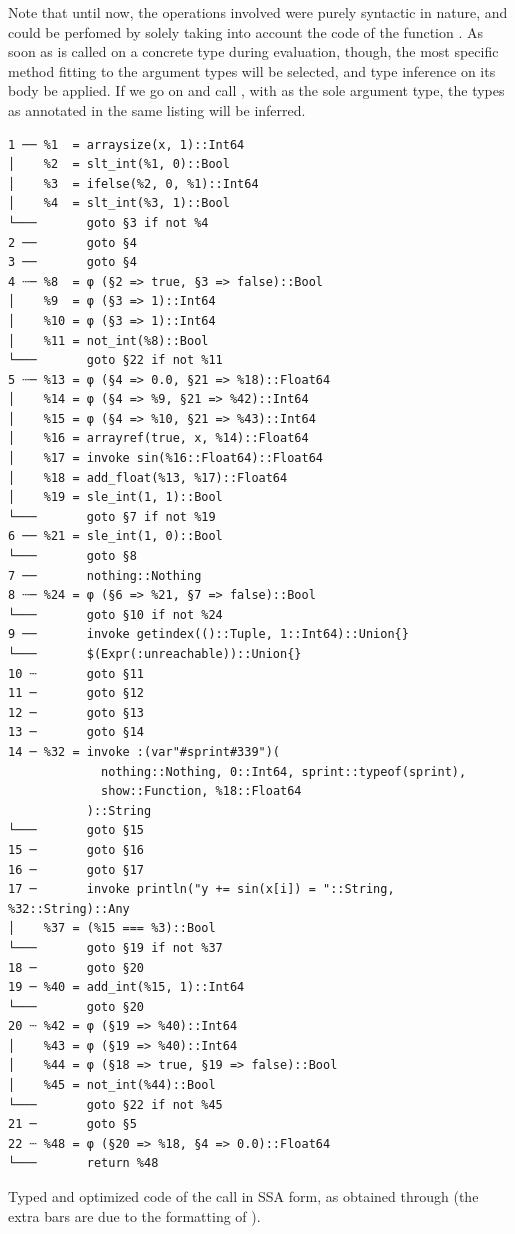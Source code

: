 Note that until now, the operations involved were purely syntactic in nature, and could be perfomed
by solely taking into account the code of the function .  As soon as  is
called on a concrete type during evaluation, though, the most specific method fitting to the
argument types will be selected, and type inference on its body be applied.  If we go on and call
, with  as the sole argument type, the types as annotated in
the same listing will be inferred.

\begin{lstfloat}[p]
  \begin{lstlisting}[style=lstfloat]
1 ── %1  = arraysize(x, 1)::Int64
│    %2  = slt_int(%1, 0)::Bool
│    %3  = ifelse(%2, 0, %1)::Int64
│    %4  = slt_int(%3, 1)::Bool
└───       goto §3 if not %4
2 ──       goto §4
3 ──       goto §4
4 ┄─ %8  = φ (§2 => true, §3 => false)::Bool
│    %9  = φ (§3 => 1)::Int64
│    %10 = φ (§3 => 1)::Int64
│    %11 = not_int(%8)::Bool
└───       goto §22 if not %11
5 ┄─ %13 = φ (§4 => 0.0, §21 => %18)::Float64
│    %14 = φ (§4 => %9, §21 => %42)::Int64
│    %15 = φ (§4 => %10, §21 => %43)::Int64
│    %16 = arrayref(true, x, %14)::Float64
│    %17 = invoke sin(%16::Float64)::Float64
│    %18 = add_float(%13, %17)::Float64
│    %19 = sle_int(1, 1)::Bool
└───       goto §7 if not %19
6 ── %21 = sle_int(1, 0)::Bool
└───       goto §8
7 ──       nothing::Nothing
8 ┄─ %24 = φ (§6 => %21, §7 => false)::Bool
└───       goto §10 if not %24
9 ──       invoke getindex(()::Tuple, 1::Int64)::Union{}
└───       $(Expr(:unreachable))::Union{}
10 ┄       goto §11
11 ─       goto §12
12 ─       goto §13
13 ─       goto §14
14 ─ %32 = invoke :(var"#sprint#339")(
             nothing::Nothing, 0::Int64, sprint::typeof(sprint), 
             show::Function, %18::Float64
           )::String
└───       goto §15
15 ─       goto §16
16 ─       goto §17
17 ─       invoke println("y += sin(x[i]) = "::String, %32::String)::Any
│    %37 = (%15 === %3)::Bool
└───       goto §19 if not %37
18 ─       goto §20
19 ─ %40 = add_int(%15, 1)::Int64
└───       goto §20
20 ┄ %42 = φ (§19 => %40)::Int64
│    %43 = φ (§19 => %40)::Int64
│    %44 = φ (§18 => true, §19 => false)::Bool
│    %45 = not_int(%44)::Bool
└───       goto §22 if not %45
21 ─       goto §5
22 ┄ %48 = φ (§20 => %18, §4 => 0.0)::Float64
└───       return %48
\end{lstlisting}
  \caption{Typed and optimized code of the call \protect{} in SSA form, as obtained
    through \protect{} (the extra bars are due to the formatting of
    \protect{}).\label{lst:foo-typed}}
\end{lstfloat}

